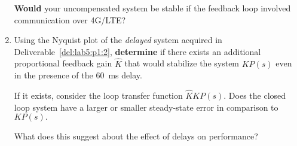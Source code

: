\begin{deliverable}[label={lab5:report}]
\begin{enumerate}[label={(\arabic*)}]
{      \textbf{Would} your uncompensated system be stable if the feedback loop involved communication over 4G/LTE?
      \label{lab5:report:q6}
    }
    \item{%
      Using the Nyquist plot of the \emph{delayed} system acquired in Deliverable~\ref{del:lab5:p1:2}, \textbf{determine} if there exists an additional proportional feedback gain \(\hat{K}\) that would stabilize the system \(K P(s)\) even in the presence of the \SI{60}{\milli\second} delay.

      If it exists, consider the loop transfer function \(\hat{K} K P(s).\)
      Does the closed loop system have a larger or smaller steady-state error in comparison to \(K P(s).\)

      What does this suggest about the effect of delays on performance?
      \label{lab5:report:q7}
    }
  \end{enumerate}
\end{deliverable}

